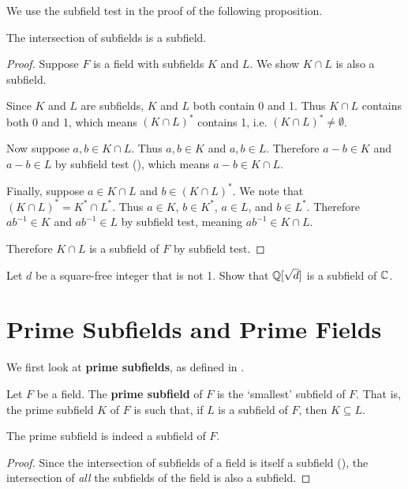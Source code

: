 We use the subfield test in the proof of the following proposition.
\begin{proposition}\label{prop-intersection-of-subfields-is-subfield}
    The intersection of subfields is a subfield.
\end{proposition}
\begin{proof}
    Suppose $F$ is a field with subfields $K$ and $L$. We show $K \cap L$ is also a subfield.

    Since $K$ and $L$ are subfields, $K$ and $L$ both contain 0 and 1. Thus $K \cap L$ contains both 0 and 1, which means $(K \cap L)^\ast$ contains 1, i.e. $(K\cap L)^\ast \neq \emptyset$.

    Now suppose $a, b \in K \cap L$. Thus $a, b \in K$ and $a, b \in L$. Therefore $a - b \in K$ and $a - b \in L$ by subfield test (), which means $a - b \in K \cap L$.

    Finally, suppose $a \in K \cap L$ and $b \in (K \cap L)^\ast$. We note that $(K \cap L)^\ast = K^\ast \cap L^\ast$. Thus $a \in K$, $b \in K^\ast$, $a \in L$, and $b \in L^\ast$. Therefore $ab^{-1} \in K$ and $ab^{-1} \in L$ by subfield test, meaning $ab^{-1} \in K \cap L$.

    Therefore $K \cap L$ is a subfield of $F$ by subfield test.
\end{proof}

\begin{exercise}
    Let $d$ be a square-free integer that is not 1. Show that $\mathbb{Q}[\sqrt{d}]$ is a subfield of $\mathbb{C}$.
\end{exercise}

\section{Prime Subfields and Prime Fields}
We first look at \textbf{prime subfields}, as defined in \cite[p.~268]{gallian_2016}.

\begin{definition}\label{definition-prime-subfield}
    Let $F$ be a field. The \textbf{prime subfield} of $F$ is the `smallest' subfield of $F$. That is, the prime subfield $K$ of $F$ is such that, if $L$ is a subfield of $F$, then $K \subseteq L$.
\end{definition}
\begin{proposition}
    The prime subfield is indeed a subfield of $F$.
\end{proposition}
\begin{proof}
    Since the intersection of subfields of a field is itself a subfield (), the intersection of \textit{all} the subfields of the field is also a subfield.
\end{proof}

